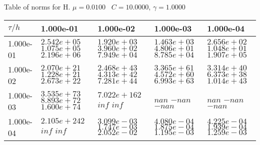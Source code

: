 \begin{center}
Table of norms for H. $\mu = 0.0100$ \, $C = 10.0000$, $\gamma = 1.0000$
  
\begin{tabular}{|p{1in}|p{1in}|p{1in}|p{1in}|p{1in}|} \hline
$\tau / h$ &1.000e-01 &1.000e-02 &1.000e-03 &1.000e-04 \\ \hline 
1.000e-01 & $2.542e+05$  $1.075e+05$  $2.196e+06$  & $1.920e+03$  $3.960e+02$  $7.949e+04$  & $1.463e+03$  $4.806e+01$  $8.785e+04$  & $2.656e+02$  $1.048e+01$  $1.907e+05$  \\ \hline 
1.000e-02 & $2.070e+21$  $1.228e+21$  $2.673e+22$  & $2.468e+43$  $4.313e+42$  $7.281e+44$  & $3.365e+61$  $4.572e+60$  $6.993e+63$  & $3.314e+40$  $6.373e+38$  $1.014e+43$  \\ \hline 
1.000e-03 & $3.535e+73$  $8.893e+72$  $1.600e+74$  & $7.022e+162$  $inf$  $inf$  & $nan$  $-nan$  $-nan$  & $nan$  $-nan$  $-nan$  \\ \hline 
1.000e-04 & $2.105e+242$  $inf$  $inf$  & $3.099e-03$  $1.747e-03$  $2.052e-02$  & $4.080e-04$  $1.875e-04$  $1.195e-03$  & $4.225e-04$  $1.939e-04$  $1.259e-03$  \\ \hline 

\end{tabular}\\[20pt]
\end{center}
